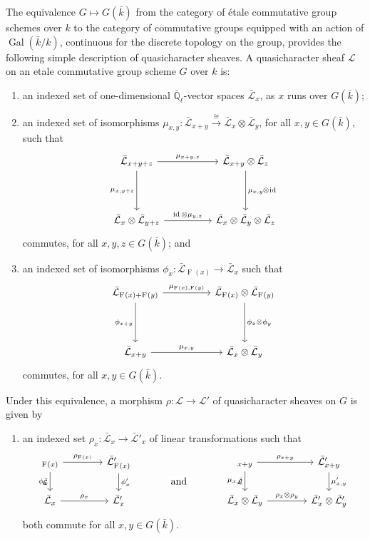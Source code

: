 \documentclass{amsart}
\makeatletter
\theoremstyle{plain}
\theoremstyle{definition}
\theoremstyle{remark}
\newcommand{\EE}{\mathbb{\bar Q}_\ell}
\newcommand{\bFq}{\bar{k}}
\newcommand{\Fq}{k}
\DeclareMathOperator{\Gal}{Gal}
\newcommand{\Frob}[1]{\operatorname{F}_{#1}}
\DeclareMathOperator{\id}{id}
\newcommand{\iso}{{\ \cong\ }}
\newcommand{\qcs}[1]{{\mathcal{#1}}}
\newcommand{\gqcs}[1]{{\mathcal{\bar #1}}}
\newcommand{\labitem}[2]{
\def\@itemlabel{\textbf{#1}}
\item
\def\@currentlabel{#1}\label{#2}}
\newcommand{\tight}[3]{\hspace{-#1pt}{#2}\hspace{-#3pt}}
\makeatother
\begin{document}
The equivalence $G \mapsto G(\bFq)$
from the category of \'etale commutative group schemes over $\Fq$ to the category of commutative groups equipped
with an action of $\Gal(\bFq/\Fq)$, continuous for the discrete topology on the group,
provides the following simple description of quasicharacter sheaves.
%
A quasicharacter sheaf $\qcs{L}$ on an etale commutative group scheme $G$ over $\Fq$ is:
\begin{enumerate}
 \labitem{(qc.1)}{qc.1} an indexed set of one-dimensional
  $\EE$-vector spaces $\gqcs{L}_x$, as $x$ runs over
  $G(\bFq)$;

 \labitem{(qc.2)}{qc.2} an indexed set of isomorphisms
  $\mu_{x,y} : \gqcs{L}_{x+y} \xrightarrow{\iso} \gqcs{L}_{x} \otimes\gqcs{L}_{y}$,
  for all $x,y \in G(\bFq)$, such that
  \[
   \begin{tikzcd}[row sep=40]
    \gqcs{L}_{x+y+z} \arrow{rr}{\mu_{x+y,z}} \arrow[swap]{d}{\mu_{x,y+z}}
    && \gqcs{L}_{x+y}\otimes\gqcs{L}_{z} \dar{\mu_{x,y} \tight{0.5}{\otimes}{1} \id} \\
    \gqcs{L}_{x} \otimes\gqcs{L}_{y+z} \arrow{rr}{\id \otimes\mu_{y,z}}
    && \gqcs{L}_{x} \otimes\gqcs{L}_{y} \otimes\gqcs{L}_{z}
   \end{tikzcd}
  \]
  commutes, for all $x,y,z\in G(\bFq)$; and
 \labitem{(qc.3)}{qc.3} an indexed set of isomorphisms $\phi_{x} : \gqcs{L}_{\Frob{}(x)} \to \gqcs{L}_x$
  such that
  \[
   \begin{tikzcd}[row sep=40]
    \gqcs{L}_{\Frob{}(x)+\Frob{}(y)} \arrow[swap]{d}{\phi_{x+y}} \arrow{rr}{\mu_{\Frob{}(x),\Frob{}(y)}}
    && \gqcs{L}_{\Frob{}(x)}\otimes\gqcs{L}_{\Frob{}(y)} \dar{\phi_x \tight{0}{\otimes}{0} \phi_y} \\
    \gqcs{L}_{x+y} \arrow{rr}{\mu_{x,y}}
    && \gqcs{L}_x \otimes\gqcs{L}_y
   \end{tikzcd}
  \]
  commutes, for all $x,y\in G(\bFq)$.
\end{enumerate}
Under this equivalence, a morphism $\rho : \qcs{L} \to \qcs{L'}$ of quasicharacter sheaves on $G$ is given by
\begin{enumerate}
 \labitem{(qc.4)}{qc.4} an indexed set $\rho_x : \gqcs{L}_x \to \gqcs{L'}_x$
  of linear transformations such that
  \[
   \begin{tikzcd}[column sep=40]
    \arrow[swap]{d}{\phi_x} \gqcs{L}_{\Frob{}(x)} \rar{\rho_{\Frob{}(x)}} & \gqcs{L'}_{\Frob{}(x)} \dar{\phi_x'}
    &\arrow[draw=none]{d}[pos=.4,description]{\text{\normalsize{and}}}
    & \arrow[swap]{d}{\mu_{x,y}} \gqcs{L}_{x+y} \rar{\rho_{x+y}} & \gqcs{L'}_{x+y} \dar{\mu'_{x,y}} \\
    \gqcs{L}_x \rar{\rho_x} & \gqcs{L'}_x
    & {} & \gqcs{L}_x\otimes\gqcs{L}_y \rar{\rho_x\otimes\rho_y} & \gqcs{L'}_x \otimes\gqcs{L'}_y
   \end{tikzcd}
  \]
  both commute for all $x, y \in G(\bFq)$.
\end{enumerate}
\end{document}
